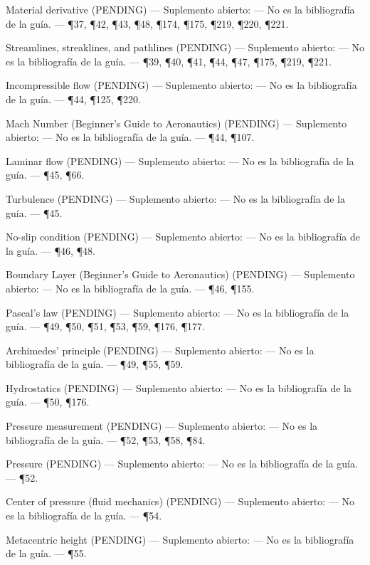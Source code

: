 \documentclass[10pt,openany]{book}
\begin{document}
\noindent Material derivative (PENDING) --- Suplemento abierto: --- No es la bibliografía de la guía. --- \P37, \P42, \P43, \P48, \P174, \P175, \P219, \P220, \P221.\par
\noindent Streamlines, streaklines, and pathlines (PENDING) --- Suplemento abierto: --- No es la bibliografía de la guía. --- \P39, \P40, \P41, \P44, \P47, \P175, \P219, \P221.\par
\noindent Incompressible flow (PENDING) --- Suplemento abierto: --- No es la bibliografía de la guía. --- \P44, \P125, \P220.\par
\noindent Mach Number (Beginner's Guide to Aeronautics) (PENDING) --- Suplemento abierto: --- No es la bibliografía de la guía. --- \P44, \P107.\par
\noindent Laminar flow (PENDING) --- Suplemento abierto: --- No es la bibliografía de la guía. --- \P45, \P66.\par
\noindent Turbulence (PENDING) --- Suplemento abierto: --- No es la bibliografía de la guía. --- \P45.\par
\noindent No-slip condition (PENDING) --- Suplemento abierto: --- No es la bibliografía de la guía. --- \P46, \P48.\par
\noindent Boundary Layer (Beginner's Guide to Aeronautics) (PENDING) --- Suplemento abierto: --- No es la bibliografía de la guía. --- \P46, \P155.\par
\noindent Pascal's law (PENDING) --- Suplemento abierto: --- No es la bibliografía de la guía. --- \P49, \P50, \P51, \P53, \P59, \P176, \P177.\par
\noindent Archimedes' principle (PENDING) --- Suplemento abierto: --- No es la bibliografía de la guía. --- \P49, \P55, \P59.\par
\noindent Hydrostatics (PENDING) --- Suplemento abierto: --- No es la bibliografía de la guía. --- \P50, \P176.\par
\noindent Pressure measurement (PENDING) --- Suplemento abierto: --- No es la bibliografía de la guía. --- \P52, \P53, \P58, \P84.\par
\noindent Pressure (PENDING) --- Suplemento abierto: --- No es la bibliografía de la guía. --- \P52.\par
\noindent Center of pressure (fluid mechanics) (PENDING) --- Suplemento abierto: --- No es la bibliografía de la guía. --- \P54.\par
\noindent Metacentric height (PENDING) --- Suplemento abierto: --- No es la bibliografía de la guía. --- \P55.\par
\end{document}
